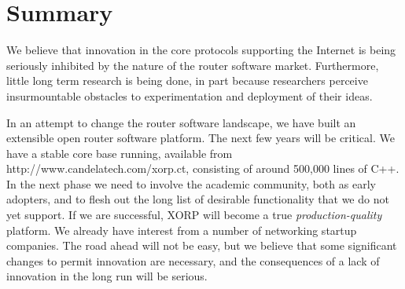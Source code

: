 
\section{Summary}




We believe that innovation in the core protocols supporting the
Internet is being seriously inhibited by the nature of the router
software market.  Furthermore, little long term research is being
done, in part because researchers perceive insurmountable obstacles to
experimentation and deployment of their ideas.

In an attempt to change the router software landscape, we have built
an extensible open router software platform.  The next few years will
be critical.  We have a stable core base running, available from
{\sf\small http://www.candelatech.com/xorp.ct}, consisting of
around 500,000 lines of C++.  In the next phase we need to involve the
academic community, both as early adopters, and to flesh out the long
list of desirable functionality that we do not yet support.  If we are
successful, XORP will become a true {\it production-quality} platform.
We already have interest from a number of networking startup
companies.  The road ahead will not be easy, but we believe that some
significant changes to permit innovation are necessary, and the
consequences of a lack of innovation in the long run will be serious.


